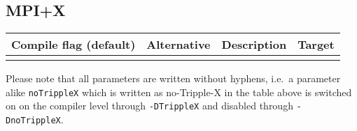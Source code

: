 \subsection*{MPI+X}

\begin{center}
 \begin{tabular}{p{2cm}p{2cm}p{8cm}l}
  Compile flag (default) & Alternative & Description & Target \\
  \hline
  \\
  \hline
 \end{tabular}
\end{center}

%

\noindent
Please note that all parameters are written without hyphens, i.e.~a parameter
alike \texttt{noTrippleX} which is written as no-Tripple-X in the table above is
switched on on the compiler level through \texttt{-DTrippleX} and disabled
through \texttt{-DnoTrippleX}.




